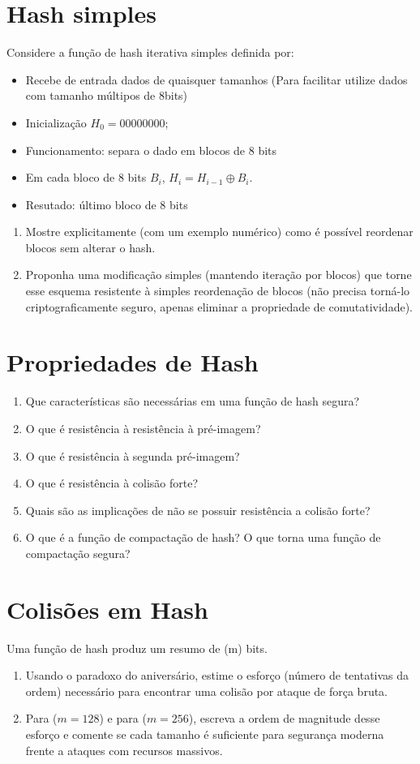 \section{Hash simples}
Considere a função de hash iterativa simples definida por:
\begin{itemize}
    \item Recebe de entrada dados de quaisquer tamanhos (Para facilitar utilize dados com tamanho múltipos de 8bits)
    \item Inicialização $H_0=00000000$;
    \item Funcionamento: separa o dado em blocos de 8 bits
    \item Em cada bloco de 8 bits $B_i$, $H_{i}=H_{i-1}\oplus B_i$.
    \item Resutado: último bloco de 8 bits
\end{itemize}

\begin{enumerate}
    \item Mostre explicitamente (com um exemplo numérico) como é possível reordenar blocos sem alterar o hash.
    \item Proponha uma modificação simples (mantendo iteração por blocos) que torne esse esquema resistente à simples reordenação de blocos (não precisa torná-lo criptograficamente seguro, apenas eliminar a propriedade de comutatividade).


\end{enumerate}

\section{Propriedades de Hash}
\begin{enumerate}
    \item Que características são necessárias em uma função de hash segura?
    \item O que é resistência à resistência à pré-imagem?
    \item O que é resistência à segunda pré-imagem?
    \item O que é resistência à colisão forte?
    \item Quais são as implicações de não se possuir resistência a colisão forte?
    \item O que é a função de compactação de hash? O que torna uma função de compactação segura?
\end{enumerate}

\section{Colisões em Hash}
Uma função de hash produz um resumo de (m) bits.
\begin{enumerate}
    \item Usando o paradoxo do aniversário, estime o esforço (número de tentativas da ordem) necessário para encontrar uma colisão por ataque de força bruta.
    \item Para ($m=128$) e para ($m=256$), escreva a ordem de magnitude desse esforço e comente se cada tamanho é suficiente para segurança moderna frente a ataques com recursos massivos.
\end{enumerate}

